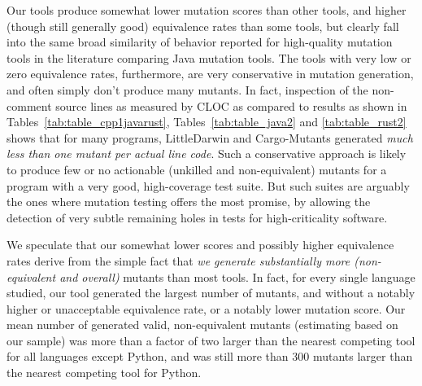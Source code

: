 \documentclass[acmsmall,screen,review,anonymous]{acmart}
\begin{document}
{Our tools produce somewhat lower mutation scores than other tools, and
higher (though still generally good) equivalence rates than some
tools, but clearly fall into the same broad similarity of behavior
reported for high-quality mutation tools in the literature comparing
Java mutation tools.   The tools with very low or zero equivalence rates, furthermore,
are very conservative in mutation generation, and often simply don't
produce many mutants.  In fact, inspection of the non-comment source
lines as measured by CLOC as compared to results as shown in Tables~\ref{tab:table_cpp1javarust},
Tables~\ref{tab:table_java2} and 
\ref{tab:table_rust2} shows that for many programs, LittleDarwin and
Cargo-Mutants generated \emph{much less than one mutant per actual
  line code}.  Such a conservative approach is likely to produce few
or no actionable (unkilled and non-equivalent) mutants for a program
with a very good, high-coverage test suite.  But such suites are
arguably the ones where mutation testing offers the most promise, by
allowing the detection of very subtle remaining holes in tests for
high-criticality software.

We speculate that our somewhat lower scores and possibly higher
equivalence rates derive from the simple fact that \emph{we generate
substantially more (non-equivalent and overall)}
mutants than most tools.  In fact, for every single language studied,
our tool generated the largest number of mutants, and without a
notably higher or unacceptable equivalence rate, or a notably lower
mutation score.  Our mean number of generated valid, non-equivalent
mutants (estimating based on our sample) was more than a factor of
two larger than the nearest competing tool for all languages except
Python, and was still more than 300 mutants larger than the nearest
competing tool for Python.

}
\end{document}
